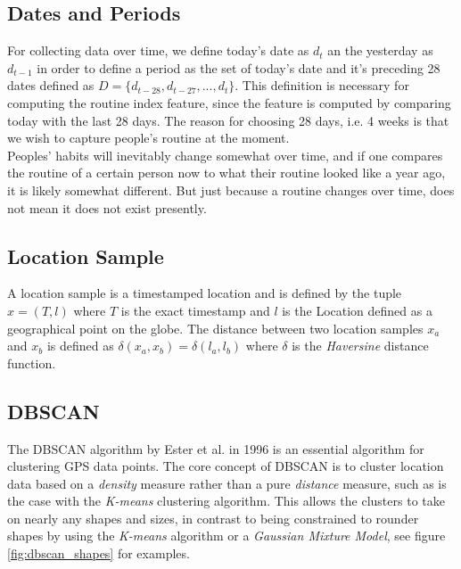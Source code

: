 \subsection{Dates and Periods}
For collecting data over time, we define today's date as $d_t$ an the yesterday as $d_{t-1}$ in order to define a period as the set of today's date and it's preceding 28 dates defined as $D = \{d_{t-28}, d_{t-27}, ..., d_{t}\}$. This definition is necessary for computing the routine index feature, since the feature is computed by comparing today with the last 28 days. The reason for choosing 28 days, i.e. 4 weeks is that we wish to capture people's routine at the moment. \\

Peoples' habits will inevitably change somewhat over time, and if one compares the routine of a certain person now to what their routine looked like a year ago, it is likely somewhat different. But just because a routine changes over time, does not mean it does not exist presently.

\subsection{Location Sample}
A location sample is a timestamped location and is defined by the tuple $x = (T, l)$ where $T$ is the exact timestamp and $l$ is the Location defined as a geographical point on the globe. The distance between two location samples $x_a$ and $x_b$ is defined as $\delta(x_a, x_b) = \delta(l_a, l_b)$ where $\delta$ is the \textit{Haversine} distance function.


\subsection{DBSCAN}
The DBSCAN algorithm by Ester et al. in 1996 \cite{density-based-1996} is an essential algorithm for clustering GPS data points. The core concept of DBSCAN is to cluster location data based on a \textit{density} measure rather than a pure \textit{distance} measure, such as is the case with the \textit{K-means} clustering algorithm. This allows the clusters to take on nearly any shapes and sizes, in contrast to being constrained to rounder shapes by using the \textit{K-means} algorithm or a \textit{Gaussian Mixture Model}, see figure \ref{fig:dbscan_shapes} for examples.

